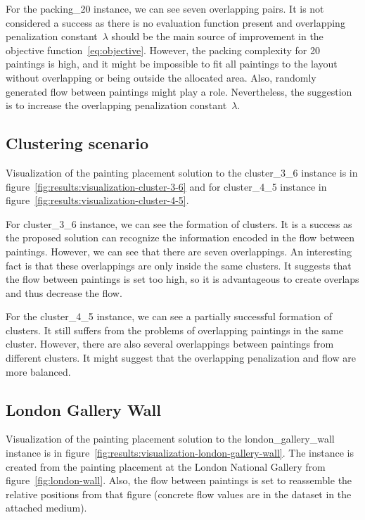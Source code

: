 For the packing\_20 instance, we can see seven overlapping pairs.
It is not considered a success as there is no evaluation function present and overlapping penalization constant~$\lambda$
should be the main source of improvement in the objective function~\ref{eq:objective}.
However, the packing complexity for 20 paintings is high, and it might be impossible to fit all paintings to the layout without overlapping or being outside the allocated area.
Also, randomly generated flow between paintings might play a role.
Nevertheless, the suggestion is to increase the overlapping penalization constant~$\lambda$.

\subsection{Clustering scenario}\label{subsec:clustering-scenario}

Visualization of the painting placement solution to the cluster\_3\_6 instance
is in figure~\ref{fig:results:visualization-cluster-3-6}
and for cluster\_4\_5 instance in figure~\ref{fig:results:visualization-cluster-4-5}.

For cluster\_3\_6 instance, we can see the formation of clusters.
It is a success as the proposed solution can recognize
the information encoded in the flow between paintings.
However, we can see that there are seven overlappings.
An interesting fact is that these overlappings are only inside the same clusters.
It suggests that the flow between paintings is set too high,
so it is advantageous to create overlaps and thus decrease the flow.

For the cluster\_4\_5 instance, we can see a partially successful formation of clusters.
It still suffers from the problems of overlapping paintings in the same cluster.
However, there are also several overlappings between paintings from different clusters.
It might suggest that the overlapping penalization and flow are more balanced.

\newpage
\subsection{London Gallery Wall}\label{subsec:london-gallery-wall}

Visualization of the painting placement solution to the london\_gallery\_wall instance
is in figure~\ref{fig:results:visualization-london-gallery-wall}.
The instance is created from the painting placement at the London National Gallery from figure~\ref{fig:london-wall}.
Also, the flow between paintings is set to reassemble the relative positions from that figure
(concrete flow values are in the dataset in the attached medium).

